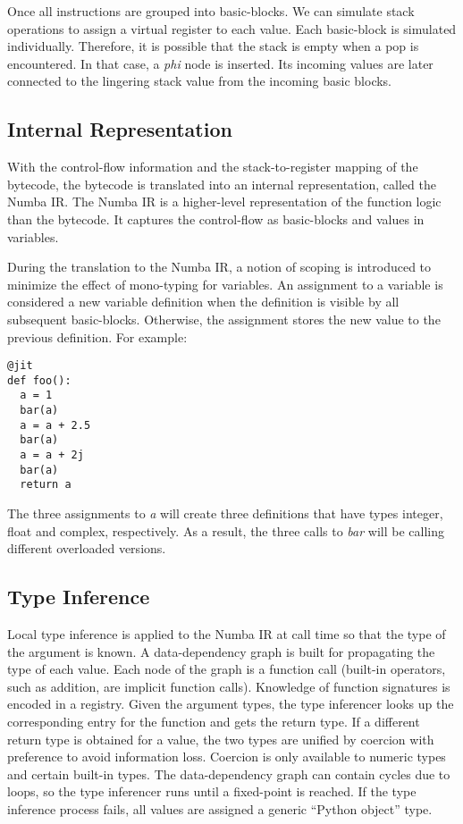 \documentclass{sig-alternate}
\begin{document}
Once all instructions are grouped into basic-blocks. We can simulate stack
operations to assign a virtual register to each value.  Each basic-block is
simulated individually. Therefore, it is possible that the stack is empty when
a pop is encountered. In that case, a \textit{phi} node is inserted.
Its incoming values are later connected to the lingering stack value from the
incoming basic blocks.

\subsection{Internal Representation}

With the control-flow information and the stack-to-register mapping
of the bytecode, the bytecode is translated into an internal representation,
called the Numba IR. The Numba IR is a higher-level representation of the
function logic than the bytecode. It captures the control-flow as basic-blocks
and values in variables.

During the translation to the Numba IR, a notion of scoping is introduced to
minimize the effect of mono-typing for variables. An assignment to a variable
is considered a new variable definition when the definition is visible by all
subsequent basic-blocks. Otherwise, the assignment stores the new value to
the previous definition.  For example:

\begin{lstlisting}
@jit
def foo():
  a = 1
  bar(a)
  a = a + 2.5
  bar(a)
  a = a + 2j
  bar(a)
  return a
\end{lstlisting}

The three assignments to \textit{a} will create three definitions that have
types integer, float and complex, respectively.  As a result, the three
calls to \textit{bar} will be calling different overloaded versions.

\subsection{Type Inference}

Local type inference is applied to the Numba IR at call time so that
the type of the argument is known. A data-dependency graph is built
for propagating the type of each value.  Each node of the graph is a
function call (built-in operators, such as addition, are implicit
function calls). Knowledge of function signatures is encoded in a
registry.  Given the argument types, the type inferencer looks up the
corresponding entry for the function and gets the return type. If a
different return type is obtained for a value, the two types are
unified by coercion with preference to avoid information
loss. Coercion is only available to numeric types and certain built-in
types. The data-dependency graph can contain cycles due to loops, so
the type inferencer runs until a fixed-point is reached. If the type
inference process fails, all values are assigned a generic ``Python
object'' type.
\end{document}
